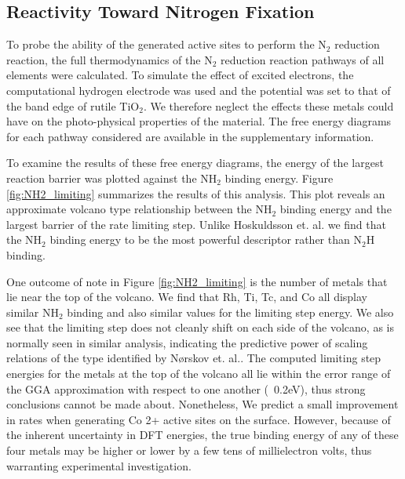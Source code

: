 \documentclass[catalysts,article,submit,moreauthors,pdftex,10pt,a4paper]{mdpi}
\theoremstyle{mdpi}
\newcounter{ex}
\newcounter{re}
\theoremstyle{mdpidefinition}
\begin{document}

\subsection{Reactivity Toward Nitrogen Fixation}

To probe the ability of the generated active sites to perform the N$_2$ reduction reaction, the full thermodynamics of the N$_2$ reduction reaction pathways of all elements were calculated. To simulate the effect of excited electrons, the computational hydrogen electrode was used and the potential was set to that of the band edge of rutile TiO$_2$. We therefore neglect the effects these metals could have on the photo-physical properties of the material. The free energy diagrams for each pathway considered are available in the supplementary information.

To examine the results of these free energy diagrams, the energy of the largest reaction barrier was plotted against the NH$_2$ binding energy. Figure \ref{fig:NH2_limiting} summarizes the results of this analysis. This plot reveals an approximate volcano type relationship between the NH$_2$ binding energy and the largest barrier of the rate limiting step. Unlike Hoskuldsson et. al.\cite{Hoskuldsson_2017} we find that the NH$_2$ binding energy to be the most powerful descriptor rather than N$_2$H binding.

One outcome of note in Figure \ref{fig:NH2_limiting} is the number of metals that lie near the top of the volcano. We find that Rh, Ti, Tc, and Co all display similar NH$_2$ binding and also similar values for the limiting step energy. We also see that the limiting step does not cleanly shift on each side of the volcano, as is normally seen in similar analysis, indicating the predictive power of scaling relations of the type identified by N{\o}rskov et. al.\cite{N_rskov_2004}. The computed limiting step energies for the metals at the top of the volcano all lie within the error range of the GGA approximation with respect to one another (~0.2eV)\cite{}, thus strong conclusions cannot be made about. Nonetheless, We predict a small improvement in rates when generating Co 2+ active sites on the surface. However, because of the inherent uncertainty in DFT energies, the true binding energy of any of these four metals may be higher or lower by a few tens of millielectron volts, thus warranting experimental investigation.
\end{document}
